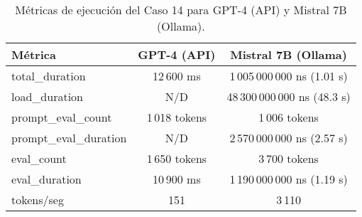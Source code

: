 
\begin{table}[h!]
\centering
\begin{tabular}{|l|c|c|}
\hline
\textbf{Métrica} & \textbf{GPT-4 (API)} & \textbf{Mistral 7B (Ollama)} \\
\hline
total\_duration & 12\,600 ms & 1\,005\,000\,000 ns (1.01 s) \\
load\_duration & N/D & 48\,300\,000\,000 ns (48.3 s) \\
prompt\_eval\_count & 1\,018 tokens & 1\,006 tokens \\
prompt\_eval\_duration & N/D & 2\,570\,000\,000 ns (2.57 s) \\
eval\_count & 1\,650 tokens & 3\,700 tokens \\
eval\_duration & 10\,900 ms & 1\,190\,000\,000 ns (1.19 s) \\
tokens/seg & 151 & 3\,110 \\
\hline
\end{tabular}
\caption{Métricas de ejecución del Caso 14 para GPT-4 (API) y Mistral 7B (Ollama).}
\end{table}
